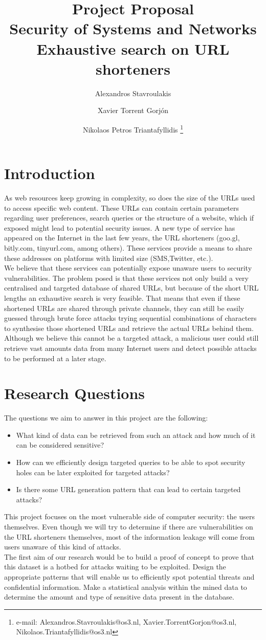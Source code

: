 \documentclass{article}
\author{Alexandros Stavroulakis%
}
\author{Xavier Torrent Gorj\'{o}n%
}
\author{Nikolaos Petros Triantafyllidis%
  \thanks{e-mail: Alexandros.Stavroulakis@os3.nl, Xavier.TorrentGorjon@os3.nl, Nikolaos.Triantafyllidis@os3.nl}}
\affil{University of Amsterdam, System and Network Engineering (MSc)}
\title{ Project Proposal \\ Security of Systems and Networks\\ Exhaustive search on URL shorteners}
\begin{document}
\maketitle


\section{Introduction}
As web resources keep growing in complexity, so does the size of the URLs used to access specific web content. These URLs can contain certain parameters regarding user preferences, search queries or the structure of a website, which if exposed might lead to potential security issues. A new type of service has appeared on the Internet in the last few years, the URL shorteners (goo.gl, bitly.com,  tinyurl.com, among others). These services provide a means to share these addresses on platforms with limited size (SMS,Twitter, etc.). \\
We believe that these services can potentially expose unaware users to security vulnerabilities. The problem posed is that these services not only build a very centralised and targeted database of shared URLs, but because of the short URL lengths an exhaustive search is very feasible. That means that even if these shortened URLs are shared through private channels, they can still be easily guessed through brute force attacks trying sequential combinations of characters to synthesise those shortened URLs and retrieve the actual URLs behind them. Although we believe this cannot be a targeted attack, a malicious user could still retrieve vast amounts data from many Internet users and detect possible attacks to be performed at a later stage. 

\newpage
\section{Research Questions}

The questions we aim to answer in this project are the following:
\begin{itemize}
  \item What kind of data can be retrieved from such an attack and how much of it can be considered sensitive?
  \item How can we efficiently design targeted queries to be able to spot security holes can be later exploited for targeted attacks?
  \item Is there some URL generation pattern that can lead to certain targeted attacks?
  \end{itemize}
This project focuses on the most vulnerable side of computer security: the users themselves. Even though we will try to determine if there are vulnerabilities on the URL shorteners themselves, most of the information leakage will come from users unaware of this kind of attacks. \\
The first aim of our research would be to build a proof of concept to prove that this dataset is a hotbed for attacks waiting to be exploited. Design the appropriate patterns that will enable us to efficiently spot potential threats and confidential information. Make a statistical analysis within the mined data to determine the amount and type of sensitive data present in the database. 
\end{document}

